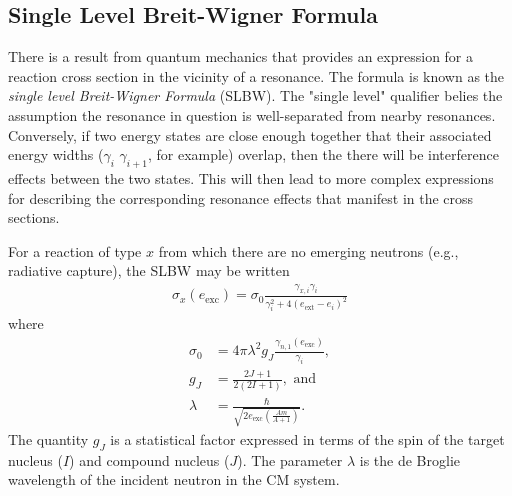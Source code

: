 \documentclass[11pt]{article}
\begin{document}
\subsection{Single Level Breit-Wigner Formula}
\label{sec:orgheadline2}
There is a result from quantum mechanics that provides an expression for a reaction cross section in the vicinity of a resonance.  The formula is known as the \emph{single level Breit-Wigner Formula} (SLBW).  The "single level" qualifier belies the assumption the resonance in question is well-separated from nearby resonances.  Conversely, if two energy states are close enough together that their associated energy widths (\(\gamma_i\) \(\gamma_{i+1}\), for example) overlap, then the there will be interference effects between the two states.  This will then lead to more complex expressions for describing the corresponding resonance effects that manifest in the cross sections.

For a reaction of type \(x\) from which there are no emerging neutrons (e.g., radiative capture), the SLBW may be written
\begin{align}
  \sigma_x(e_{\text{exc}}) = \sigma_0 \frac{\gamma_{x,i}\gamma_i}{\gamma_i^2+4(e_\text{ext}-e_i)^2}
\end{align}
where
\begin{align}
 \sigma_0 &= 4\pi \lambda^2 g_J \frac{\gamma_{n,1}(e_\text{exc})}{\gamma_i},  \\
  g_J &= \frac{2J+1}{2(2I+1)}, \text{ and} \\
  \lambda &= \frac{\hbar}{\sqrt{2e_\text{exc} \left( \frac{Am}{A+1} \right)}}.
\end{align}
The quantity \(g_J\) is a statistical factor expressed in terms of the spin of the target nucleus (\(I\)) and compound nucleus (\(J\)).  The parameter \(\lambda\) is the de Broglie wavelength of the incident neutron in the CM system.
\end{document}
